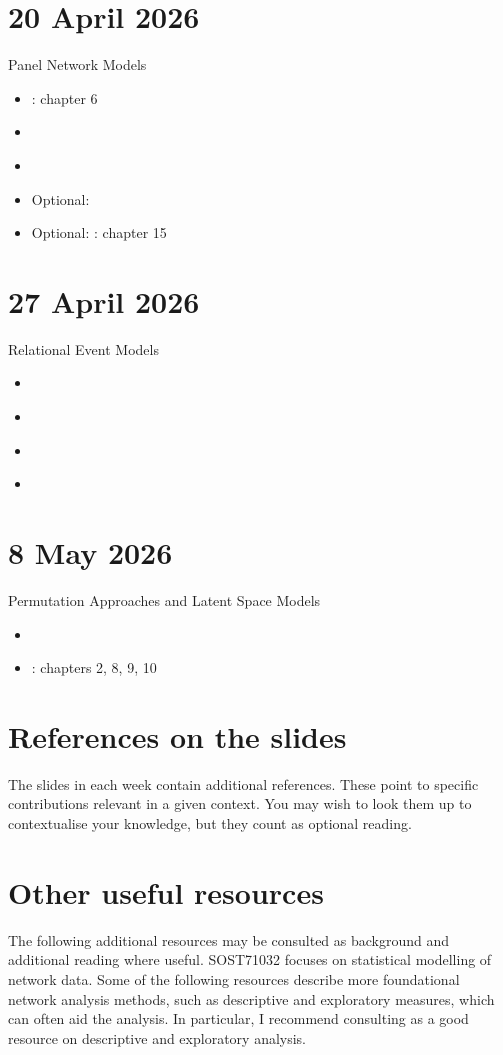 \documentclass[a4paper,12pt]{article}
\begin{document}
\section*{20 April 2026}
Panel Network Models

\begin{itemize}
	\item \citet{cranmer2020inferential}: chapter 6
	\item \citet{leifeld2018temporal}
	\item \citet{snijders2010introduction}
	\item Optional: \citet{leifeld2019theoretical}
	\item Optional: \citet{borgatti2024analyzing}: chapter 15
\end{itemize}


\section*{27 April 2026}
Relational Event Models

\begin{itemize}
	\item \citet{bianchi2024relational}
	\item \citet{butts2008relational}
	\item \citet{brandes2009networks}
	\item \citet{leifeld2026endogenous}
\end{itemize}

\section*{8 May 2026}
Permutation Approaches and Latent Space Models

\begin{itemize}
	\item \citet{cranmer2017navigating}
	\item \citet{cranmer2020inferential}: chapters 2, 8, 9, 10
\end{itemize}

\section*{References on the slides}
The slides in each week contain additional references.
These point to specific contributions relevant in a given context.
You may wish to look them up to contextualise your knowledge, but they count as optional reading.

\section*{Other useful resources}
The following additional resources may be consulted as background and additional reading where useful.
SOST71032 focuses on statistical modelling of network data.
Some of the following resources describe more foundational network analysis methods, such as descriptive and exploratory measures, which can often aid the analysis.
In particular, I recommend consulting \citet{rawlings2023integrating} as a good resource on descriptive and exploratory analysis.
\end{document}
